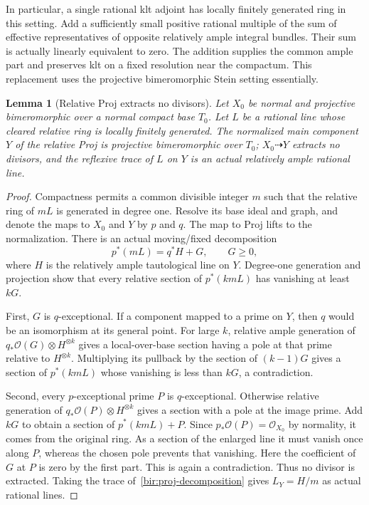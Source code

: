 \documentclass[11pt,letterpaper]{article}
\newcommand{\OO}{\mathcal{O}}
\newtheorem{lemma}[theorem]{Lemma}
\theoremstyle{definition}
\theoremstyle{remark}
\begin{document}
In particular, a single rational klt adjoint has locally finitely
generated ring in this setting.  Add a sufficiently small positive
rational multiple of the sum of effective representatives of opposite
relatively ample integral bundles.  Their sum is actually linearly
equivalent to zero.  The addition supplies the common ample part and
preserves klt on a fixed resolution near the compactum.  This
replacement uses the projective bimeromorphic Stein setting
essentially.

\begin{lemma}[Relative Proj extracts no divisors]
\label{bir:proj-nonextraction}
Let $X_0$ be normal and projective bimeromorphic over a normal compact
base $T_0$.  Let $L$ be a rational line whose cleared relative ring is
locally finitely generated.  The normalized main component $Y$ of the
relative Proj is projective bimeromorphic over $T_0$;
$X_0\dashrightarrow Y$ extracts no divisors, and the reflexive trace
of $L$ on $Y$ is an actual relatively ample rational line.
\end{lemma}

\begin{proof}
Compactness permits a common divisible integer $m$ such that the
relative ring of $mL$ is generated in degree one.  Resolve its base
ideal and graph, and denote the maps to $X_0$ and $Y$ by $p$ and $q$.
The map to Proj lifts to the normalization.  There is an actual
moving/fixed decomposition
\begin{equation}
 p^*(mL)=q^*H+G,\qquad G\geq0,
 \label{bir:proj-decomposition}
\end{equation}
where $H$ is the relatively ample tautological line on $Y$.  Degree-one
generation and projection show that every relative section of
$p^*(kmL)$ has vanishing at least $kG$.

First, $G$ is $q$-exceptional.  If a component mapped to a prime on
$Y$, then $q$ would be an isomorphism at its general point.  For large
$k$, relative ample generation of
$q_*\OO(G)\otimes H^{\otimes k}$ gives a local-over-base section having
a pole at that prime relative to $H^{\otimes k}$.  Multiplying its
pullback by the section of $(k-1)G$ gives a section of $p^*(kmL)$ whose
vanishing is less than $kG$, a contradiction.

Second, every $p$-exceptional prime $P$ is $q$-exceptional.  Otherwise
relative generation of $q_*\OO(P)\otimes H^{\otimes k}$ gives a section
with a pole at the image prime.  Add $kG$ to obtain a section of
$p^*(kmL)+P$.  Since $p_*\OO(P)=\OO_{X_0}$ by normality, it comes from
the original ring.  As a section of the enlarged line it must vanish
once along $P$, whereas the chosen pole prevents that vanishing.
Here the coefficient of $G$ at $P$ is zero by the first part.  This is
again a contradiction.  Thus no divisor is extracted.  Taking the
trace of~\eqref{bir:proj-decomposition} gives $L_Y=H/m$ as actual
rational lines.
\end{proof}
\end{document}
